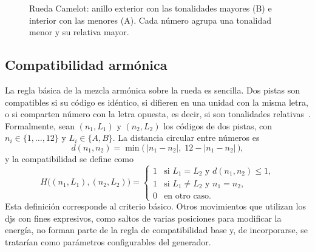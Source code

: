 \begin{figure}[htbp]
  \centering
  \caption{Rueda Camelot: anillo exterior con las tonalidades mayores (B) e interior con las menores (A). Cada número agrupa una tonalidad menor y su relativa mayor.}
  \label{fig:fund-camelot}
\end{figure}

\subsection{Compatibilidad armónica}

La regla básica de la mezcla armónica sobre la rueda es sencilla. Dos pistas son compatibles si su código es idéntico, si difieren en una unidad con la misma letra, o si comparten número con la letra opuesta, es decir, si son tonalidades relativas~\cite{mixedinkey_camelot}. Formalmente, sean $(n_1, L_1)$ y $(n_2, L_2)$ los códigos de dos pistas, con $n_i \in \{1,\dots,12\}$ y $L_i \in \{A, B\}$. La distancia circular entre números es
\begin{equation}
  d(n_1, n_2) = \min\bigl(\,|n_1 - n_2|,\; 12 - |n_1 - n_2|\,\bigr),
  \label{eq:dcirc}
\end{equation}
y la compatibilidad se define como
\begin{equation}
  H\bigl((n_1,L_1),(n_2,L_2)\bigr) =
  \begin{cases}
    1 & \text{si } L_1 = L_2 \text{ y } d(n_1,n_2) \le 1, \\
    1 & \text{si } L_1 \ne L_2 \text{ y } n_1 = n_2, \\
    0 & \text{en otro caso.}
  \end{cases}
  \label{eq:compat}
\end{equation}
Esta definición corresponde al criterio básico. Otros movimientos que utilizan los \acsp{dj} con fines expresivos, como saltos de varias posiciones para modificar la energía, no forman parte de la regla de compatibilidad base y, de incorporarse, se tratarían como parámetros configurables del generador.

